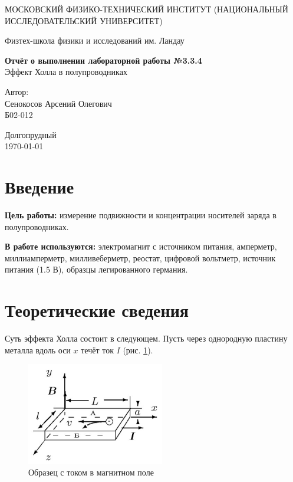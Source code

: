 \documentclass[a4paper,12pt]{article} %
\date{\today}
\begin{document}
\begin{titlepage}
	\begin{center}
		{\large МОСКОВСКИЙ ФИЗИКО-ТЕХНИЧЕСКИЙ ИНСТИТУТ (НАЦИОНАЛЬНЫЙ ИССЛЕДОВАТЕЛЬСКИЙ УНИВЕРСИТЕТ)}
	\end{center}
	\begin{center}
		{\large Физтех-школа физики и исследований им. Ландау}
	\end{center}
	
	
	\vspace{4.5cm}
	{\huge
		\begin{center}
			{\bf Отчёт о выполнении лабораторной работы №3.3.4}\\
			Эффект Холла в полупроводниках
		\end{center}
	}
	\vspace{2cm}
	\begin{flushright}
		{\LARGE Автор:\\ Сенокосов Арсений Олегович \\
			\vspace{0.2cm}
			Б02-012}
	\end{flushright}
	\vspace{8cm}
	\begin{center}
		Долгопрудный\\
		\today
	\end{center}
\end{titlepage}

\section{Введение}

\textbf{Цель работы:} измерение подвижности и концентрации носителей заряда в полупроводниках.

\textbf{В работе используются:} электромагнит с источником питания, амперметр, миллиамперметр, милливеберметр, реостат, цифровой вольтметр, источник питания (1.5 В), образцы легированного германия.


\section{Теоретические сведения}

Суть эффекта Холла состоит в следующем. Пусть через однородную пластину металла вдоль оси $ x $ течёт ток $ I $ (рис. \ref{ris1}).

\begin{figure}
	\includegraphics[width=6cm]{holl.jpg}
	\caption{Образец с током в магнитном поле}
	\label{ris1}
\end{figure}
\end{document}
